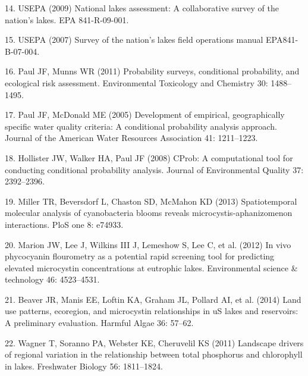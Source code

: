 \documentclass[11pt,]{article}
\begin{document}
\hypertarget{ref-usepa2009national}{}
14. USEPA (2009) National lakes assessment: A collaborative survey of
the nation's lakes. EPA 841-R-09-001.

\hypertarget{ref-nlaux5ffieldops}{}
15. USEPA (2007) Survey of the nation's lakes field operations manual
EPA841-B-07-004.

\hypertarget{ref-paul2011probability}{}
16. Paul JF, Munns WR (2011) Probability surveys, conditional
probability, and ecological risk assessment. Environmental Toxicology
and Chemistry 30: 1488--1495.

\hypertarget{ref-paul2005development}{}
17. Paul JF, McDonald ME (2005) Development of empirical, geographically
specific water quality criteria: A conditional probability analysis
approach. Journal of the American Water Resources Association 41:
1211--1223.

\hypertarget{ref-hollister2008cprob}{}
18. Hollister JW, Walker HA, Paul JF (2008) CProb: A computational tool
for conducting conditional probability analysis. Journal of
Environmental Quality 37: 2392--2396.

\hypertarget{ref-miller2013spatiotemporal}{}
19. Miller TR, Beversdorf L, Chaston SD, McMahon KD (2013)
Spatiotemporal molecular analysis of cyanobacteria blooms reveals
microcystis-aphanizomenon interactions. PloS one 8: e74933.

\hypertarget{ref-marion2012vivo}{}
20. Marion JW, Lee J, Wilkins III J, Lemeshow S, Lee C, et al. (2012) In
vivo phycocyanin flourometry as a potential rapid screening tool for
predicting elevated microcystin concentrations at eutrophic lakes.
Environmental science \& technology 46: 4523--4531.

\hypertarget{ref-beaver2014land}{}
21. Beaver JR, Manis EE, Loftin KA, Graham JL, Pollard AI, et al. (2014)
Land use patterns, ecoregion, and microcystin relationships in uS lakes
and reservoirs: A preliminary evaluation. Harmful Algae 36: 57--62.

\hypertarget{ref-wagner2011landscape}{}
22. Wagner T, Soranno PA, Webster KE, Cheruvelil KS (2011) Landscape
drivers of regional variation in the relationship between total
phosphorus and chlorophyll in lakes. Freshwater Biology 56: 1811--1824.
\end{document}
